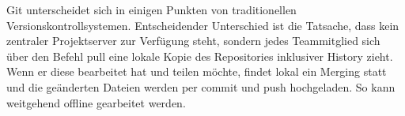 Git unterscheidet sich in einigen Punkten von traditionellen Versionskontrollsystemen. Entscheidender Unterschied ist die Tatsache, dass kein zentraler Projektserver zur Verfügung steht, sondern jedes Teammitglied sich über den Befehl pull eine lokale Kopie des Repositories inklusiver History zieht. Wenn er diese bearbeitet hat und teilen möchte, findet lokal ein Merging  statt und die geänderten Dateien werden per commit und push hochgeladen. So kann weitgehend offline gearbeitet werden. 


\autorende{}